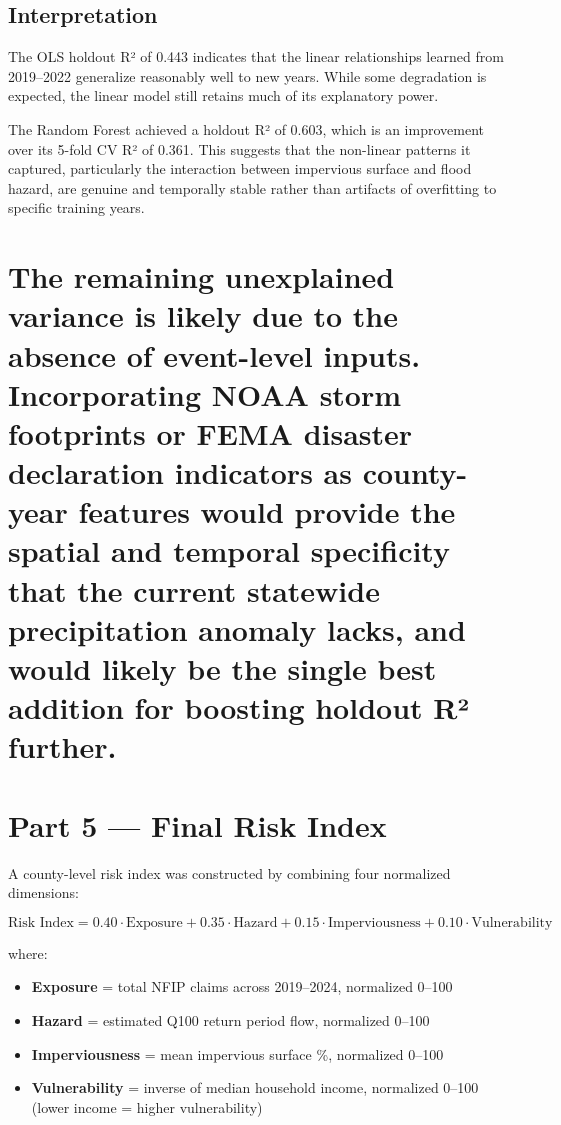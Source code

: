 \documentclass[
  letterpaper,
  DIV=11,
  numbers=noendperiod]{scrartcl}
\providecommand{\tightlist}{%
  \setlength{\itemsep}{0pt}\setlength{\parskip}{0pt}}
\begin{document}
\subsection{Interpretation}\label{interpretation}

The OLS holdout R² of 0.443 indicates that the linear relationships
learned from 2019--2022 generalize reasonably well to new years. While
some degradation is expected, the linear model still retains much of its
explanatory power.

The Random Forest achieved a holdout R² of 0.603, which is an
improvement over its 5-fold CV R² of 0.361. This suggests that the
non-linear patterns it captured, particularly the interaction between
impervious surface and flood hazard, are genuine and temporally stable
rather than artifacts of overfitting to specific training years.

\section{The remaining unexplained variance is likely due to the absence
of event-level inputs. Incorporating NOAA storm footprints or FEMA
disaster declaration indicators as county-year features would provide
the spatial and temporal specificity that the current statewide
precipitation anomaly lacks, and would likely be the single best
addition for boosting holdout R²
further.}\label{the-remaining-unexplained-variance-is-likely-due-to-the-absence-of-event-level-inputs.-incorporating-noaa-storm-footprints-or-fema-disaster-declaration-indicators-as-county-year-features-would-provide-the-spatial-and-temporal-specificity-that-the-current-statewide-precipitation-anomaly-lacks-and-would-likely-be-the-single-best-addition-for-boosting-holdout-ruxb2-further.}

\section{Part 5 --- Final Risk Index}\label{part-5-final-risk-index}

A county-level risk index was constructed by combining four normalized
dimensions:

\[
\text{Risk Index} = 0.40 \cdot \text{Exposure} + 0.35 \cdot \text{Hazard} +
0.15 \cdot \text{Imperviousness} + 0.10 \cdot \text{Vulnerability}
\]

where:

\begin{itemize}
\tightlist
\item
  \textbf{Exposure} = total NFIP claims across 2019--2024, normalized
  0--100
\item
  \textbf{Hazard} = estimated Q100 return period flow, normalized 0--100
\item
  \textbf{Imperviousness} = mean impervious surface \%, normalized
  0--100
\item
  \textbf{Vulnerability} = inverse of median household income,
  normalized 0--100 (lower income = higher vulnerability)
\end{itemize}
\end{document}
